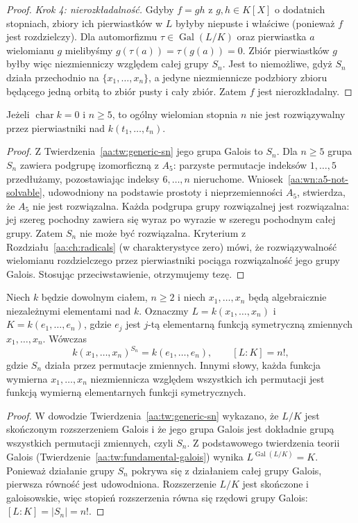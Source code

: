 \begin{proof}
\emph{Krok 4: nierozkładalność.}
Gdyby $f=gh$ z $g,h\in K[X]$ o dodatnich stopniach,
zbiory ich pierwiastków w $L$ byłyby niepuste i właściwe
(ponieważ $f$ jest rozdzielczy).
Dla automorfizmu $\tau\in\operatorname{Gal}(L/K)$ oraz pierwiastka
$a$ wielomianu $g$ mielibyśmy $g(\tau(a))=\tau(g(a))=0$.
Zbiór pierwiastków $g$ byłby więc niezmienniczy względem
całej grupy $S_n$. Jest to niemożliwe, gdyż $S_n$ działa
przechodnio na $\{x_1,\ldots,x_n\}$, a jedyne niezmiennicze
podzbiory zbioru będącego jedną orbitą to zbiór pusty i cały zbiór.
Zatem $f$ jest nierozkładalny.
\end{proof}

\begin{wniosek}
\label{aa:wn:generic-abel}
Jeżeli $\operatorname{char}k=0$ i $n\ge5$, to ogólny wielomian
stopnia $n$ nie jest rozwiązywalny przez pierwiastniki nad
$k(t_1,\ldots,t_n)$.
\end{wniosek}
\begin{proof}
Z Twierdzenia~\ref{aa:tw:generic-sn} jego grupa Galois to $S_n$.
Dla $n\ge5$ grupa $S_n$ zawiera podgrupę izomorficzną
z $A_5$: parzyste permutacje indeksów $1,\ldots,5$
przedłużamy, pozostawiając indeksy $6,\ldots,n$ nieruchome.
Wniosek~\ref{aa:wn:a5-not-solvable}, udowodniony na podstawie
prostoty i nieprzemienności $A_5$, stwierdza,
że $A_5$ nie jest rozwiązalna.
Każda podgrupa grupy rozwiązalnej jest rozwiązalna:
jej szereg pochodny zawiera się wyraz po wyrazie
w szeregu pochodnym całej grupy.
Zatem $S_n$ nie może być rozwiązalna.
Kryterium z Rozdziału~\ref{aa:ch:radicals} (w charakterystyce zero)
mówi, że rozwiązywalność wielomianu rozdzielczego przez pierwiastniki
pociąga rozwiązalność jego grupy Galois.
Stosując przeciwstawienie, otrzymujemy tezę.
\end{proof}

\begin{wniosek}
\label{aa:wn:generic-invariants}
Niech $k$ będzie dowolnym ciałem, $n\ge2$ i niech
$x_1,\ldots,x_n$ będą algebraicznie niezależnymi elementami
nad $k$. Oznaczmy $L=k(x_1,\ldots,x_n)$ i
$K=k(e_1,\ldots,e_n)$, gdzie $e_j$ jest $j$-tą elementarną
funkcją symetryczną zmiennych $x_1,\ldots,x_n$.
Wówczas
\[
 k(x_1,\ldots,x_n)^{S_n}=k(e_1,\ldots,e_n),
 \qquad [L:K]=n!,
\]
gdzie $S_n$ działa przez permutacje zmiennych. Innymi słowy,
każda funkcja wymierna $x_1,\ldots,x_n$ niezmiennicza względem
wszystkich ich permutacji jest funkcją wymierną elementarnych
funkcji symetrycznych.
\end{wniosek}
\begin{proof}
W dowodzie Twierdzenia~\ref{aa:tw:generic-sn} wykazano, że
$L/K$ jest skończonym rozszerzeniem Galois i że jego grupa
Galois jest dokładnie grupą wszystkich permutacji zmiennych,
czyli $S_n$. Z podstawowego twierdzenia teorii Galois
(Twierdzenie~\ref{aa:tw:fundamental-galois}) wynika
$L^{\operatorname{Gal}(L/K)}=K$. Ponieważ działanie
grupy $S_n$ pokrywa się z działaniem całej grupy Galois,
pierwsza równość jest udowodniona.
Rozszerzenie $L/K$ jest skończone i galoisowskie,
więc stopień rozszerzenia równa się rzędowi grupy Galois:
$[L:K]=|S_n|=n!$.
\end{proof}

